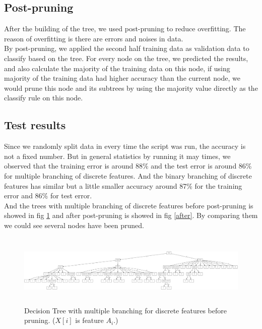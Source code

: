 \documentclass[11pt]{article}
\begin{document}
\subsection{Post-pruning}

After the building of the tree, we used post-pruning to reduce overfitting. The reason of overfitting is there are errors and noises
in data. \\
By post-pruning, we applied the second half training data as validation data to classify based on the tree.
For every node on the tree, we predicted the results, and also calculate the majority of the training data on this node,
if using majority of the training data had higher accuracy than the current node, we would prune this node and its subtrees by using
the majority value directly as the classify rule on this node.

\subsection{Test results}

Since we randomly split data in every time the script was run, the accuracy is not a fixed number. But in general statistics by running it may times,
we observed that the training error is around 88\% and the test error is around 86\% for multiple branching of discrete features. And the binary branching of discrete features has similar but a little smaller accuracy around 87\% for the training error and 86\% for test error.\\
And the trees with multiple branching of discrete features before post-pruning is showed in fig \ref{before} and after post-pruning is showed in fig \ref{after}. By comparing them we could see
several nodes have been pruned.

\begin{figure}[h!]
\centering
\hspace*{-0.5in}
\includegraphics[height=1.362in, width=7.5in]{before.png}
\caption{Decision Tree with multiple branching for discrete features before pruning. ($X[i]$ is feature $A_i$.)} 
\label{before}
\end{figure}
\end{document}
